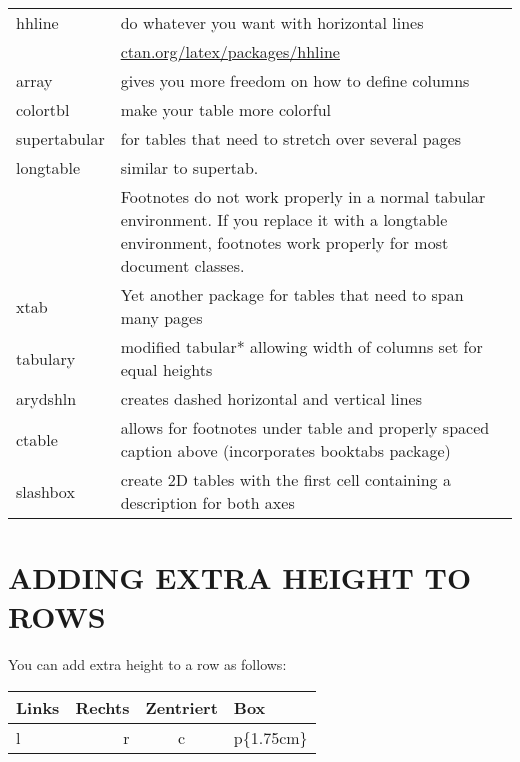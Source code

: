\begin{longtable}{lp{7cm}}
\toprule
hhline &do whatever you want with horizontal lines\\
       &\url{ctan.org/latex/packages/hhline}\\

array &gives you more freedom on how to define columns\\
colortbl &make your table more colorful\\
supertabular &for tables that need to stretch over several pages\\
longtable &similar to supertab.\\
          &\small Footnotes do not work properly in a normal tabular environment. If you replace it with a longtable environment, footnotes work properly for most document classes.\\

xtab &Yet another package for tables that need to span many pages\\

tabulary &modified tabular* allowing width of columns set for equal heights\\

arydshln &creates dashed horizontal and vertical lines\\

ctable &allows for footnotes under table and properly spaced caption above (incorporates booktabs package)\\

slashbox &create 2D tables with the first cell containing a description for both axes\\
\bottomrule
\end{longtable}


\clearpage

\section{ADDING EXTRA HEIGHT TO ROWS}

You can add extra height to a row as follows:

\begin{teXXX}
\setlength\extrarowheight{2pt}
\begin{tabular}{|l|r|c|p{1.75cm}|}\hline
  Links & Rechts & Zentriert & Box\\\hline
  \rowcolor{cyan!40}
  l & r & c & p\{1.75cm\}\\\hline
\end{tabular}
\end{teXXX}

